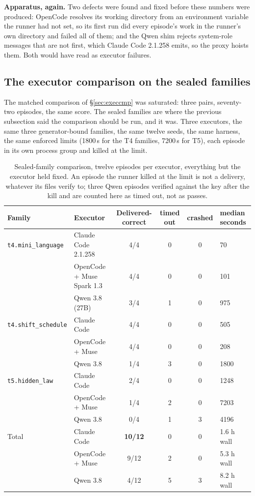 \documentclass[11pt]{article}
\theoremstyle{definition}
\begin{document}
\textbf{Apparatus, again.} Two defects were found and fixed before these numbers were produced: OpenCode resolves its working directory from an environment variable the runner had not set, so its first run did every episode's work in the runner's own directory and failed all of them; and the Qwen shim rejects system-role messages that are not first, which Claude Code 2.1.258 emits, so the proxy hoists them. Both would have read as executor failures.

\subsection{The executor comparison on the sealed families}\label{sec:sealedcmp}

The matched comparison of \S\ref{sec:execcmp} was saturated: three pairs, seventy-two episodes, the same score. The sealed families are where the previous subsection said the comparison should be run, and it was. Three executors, the same three generator-bound families, the same twelve seeds, the same harness, the same enforced limits (1800\,s for the T4 families, 7200\,s for T5), each episode in its own process group and killed at the limit.

\begin{table}[!htbp]
\centering\small
\begin{tabularx}{\textwidth}{@{}llcccY@{}}
\toprule
Family & Executor & Delivered-correct & timed out & crashed & median seconds \\
\midrule
\texttt{t4.mini\_language} & Claude Code 2.1.258 & 4/4 & 0 & 0 & 70 \\
 & OpenCode + Muse Spark 1.3 & 4/4 & 0 & 0 & 101 \\
 & Qwen 3.8 (27B) & 3/4 & 1 & 0 & 975 \\
\midrule
\texttt{t4.shift\_schedule} & Claude Code & 4/4 & 0 & 0 & 505 \\
 & OpenCode + Muse & 4/4 & 0 & 0 & 208 \\
 & Qwen 3.8 & 1/4 & 3 & 0 & 1800 \\
\midrule
\texttt{t5.hidden\_law} & Claude Code & 2/4 & 0 & 0 & 1248 \\
 & OpenCode + Muse & 1/4 & 2 & 0 & 7203 \\
 & Qwen 3.8 & 0/4 & 1 & 3 & 4196 \\
\midrule
Total & Claude Code & \textbf{10/12} & 0 & 0 & 1.6 h wall \\
 & OpenCode + Muse & 9/12 & 2 & 0 & 5.3 h wall \\
 & Qwen 3.8 & 4/12 & 5 & 3 & 8.2 h wall \\
\bottomrule
\end{tabularx}
\caption{Sealed-family comparison, twelve episodes per executor, everything but the executor held fixed. An episode the runner killed at the limit is not a delivery, whatever its files verify to; three Qwen episodes verified against the key after the kill and are counted here as timed out, not as passes.}
\label{tab:sealedcmp}
\end{table}
\end{document}
